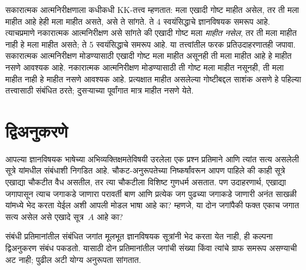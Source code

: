 सकारात्मक आत्मनिरीक्षणाला कधीकधी KK-तत्त्व म्हणतात:
मला एखादी गोष्ट माहीत असेल, तर ती मला माहीत आहे
हेही मला माहीत असते, असे ते सांगते. ते 4 स्वयंसिद्धाचे
ज्ञानविषयक समरूप आहे. त्याचप्रमाणे नकारात्मक
आत्मनिरीक्षण असे सांगते की एखादी गोष्ट मला
\emph{माहीत नसेल}, तर ती मला माहीत नाही हे मला
माहीत असते; ते 5 स्वयंसिद्धाचे समरूप आहे. या
तत्त्वांतील फरक प्रतिउदाहरणातही जपावा. सकारात्मक
आत्मनिरीक्षण मोडण्यासाठी एखादी गोष्ट मला माहीत असूनही
ती मला माहीत आहे हे माहीत नसणे आवश्यक आहे.
नकारात्मक आत्मनिरीक्षण मोडण्यासाठी ती गोष्ट मला
माहीत नसूनही, ती मला माहीत नाही हे माहीत नसणे
आवश्यक आहे. प्रत्यक्षात माहीत असलेल्या गोष्टीबद्दल
साशंक असणे हे पहिल्या तत्त्वासाठी संबंधित ठरते;
दुसऱ्याच्या पूर्वांगात मात्र माहीत नसणे येते.














\section{द्विअनुकरणे}\label{aml:el:bsd:sec}

आपल्या ज्ञानविषयक भाषेच्या अभिव्यक्तिक्षमतेविषयी
उरलेला एक प्रश्न प्रतिमाने आणि त्यांत सत्य असलेली
सूत्रे यांमधील संबंधाशी निगडित आहे. चौकट-अनुरूपतेच्या
निष्कर्षांवरून आपण पाहिले की काही सूत्रे एखाद्या
चौकटीत वैध असतील, तर त्या चौकटीला विशिष्ट गुणधर्म
असतात. पण उदाहरणार्थ, एखाद्या जगापासून त्याच
जगाकडे जाणारा परावर्ती बाण आणि प्रत्येक जग पुढच्या
जगाकडे जाणारी अनंत साखळी यांमध्ये भेद करता येईल
अशी आपली मोडल भाषा आहे का? म्हणजे, या दोन
जगांपैकी फक्त एकाच जगात सत्य असेल असे एखादे
सूत्र~$A$ आहे का?

संबंधी प्रतिमानांतील संबंधित जगांत मूलभूत
ज्ञानविषयक सूत्रांनी भेद करता येत नाही, ही कल्पना
द्विअनुकरण संबंध पकडतो. यासाठी दोन प्रतिमानांतील
जगांची संख्या किंवा त्यांचे ग्राफ समरूप असण्याची
अट नाही; पुढील अटी योग्य अनुरूपता सांगतात.

